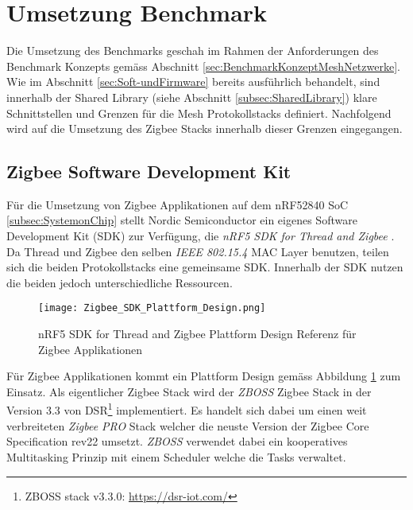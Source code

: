 \clearpage
\section{Umsetzung Benchmark}\label{sec:ZigbeeUmsetzungBenchmark}

Die Umsetzung des Benchmarks geschah im Rahmen der Anforderungen des Benchmark Konzepts gemäss Abschnitt \ref{sec:BenchmarkKonzeptMeshNetzwerke}.
Wie im Abschnitt \ref{sec:Soft-undFirmware} bereits ausführlich behandelt, sind innerhalb der Shared Library (siehe Abschnitt \ref{subsec:SharedLibrary}) klare Schnittstellen und Grenzen für die Mesh Protokollstacks definiert.
Nachfolgend wird auf die Umsetzung des Zigbee Stacks innerhalb dieser Grenzen eingegangen.

\subsection{Zigbee Software Development Kit}\label{subsec:ZigbeeSoftwareDevelopmentKit}
Für die Umsetzung von Zigbee Applikationen auf dem nRF52840 SoC \ref{subsec:SystemonChip} stellt Nordic Semiconductor ein eigenes Software Development Kit (SDK) zur Verfügung, die \textit{nRF5 SDK for Thread and Zigbee} \cite{nordic_semi_nrf_sdk_for_thread_and_zigbee_2020}.
Da Thread und Zigbee den selben \textit{IEEE 802.15.4} MAC Layer benutzen, teilen sich die beiden Protokollstacks eine gemeinsame SDK.
Innerhalb der SDK nutzen die beiden jedoch unterschiedliche Ressourcen.

\begin{figure}[h]
	\centering
	\texttt{[image: Zigbee\_SDK\_Plattform\_Design.png]}
	\caption{nRF5 SDK for Thread and Zigbee Plattform Design Referenz für Zigbee Applikationen \cite{nordic_semi_nrf_sdk_for_thread_and_zigbee_2020}}
	\label{fig:ZigbeePlattformDesign}
\end{figure}

Für Zigbee Applikationen kommt ein Plattform Design gemäss Abbildung \ref{fig:ZigbeePlattformDesign} zum Einsatz. 
Als eigentlicher Zigbee Stack wird der \textit{ZBOSS} Zigbee Stack in der Version 3.3 von DSR\footnote{ZBOSS stack v3.3.0: \url{https://dsr-iot.com/}} implementiert.
Es handelt sich dabei um einen weit verbreiteten \textit{Zigbee PRO} Stack welcher die neuste Version der Zigbee Core Specification rev22 umsetzt.
\textit{ZBOSS} verwendet dabei ein kooperatives Multitasking Prinzip mit einem Scheduler welche die Tasks verwaltet.


